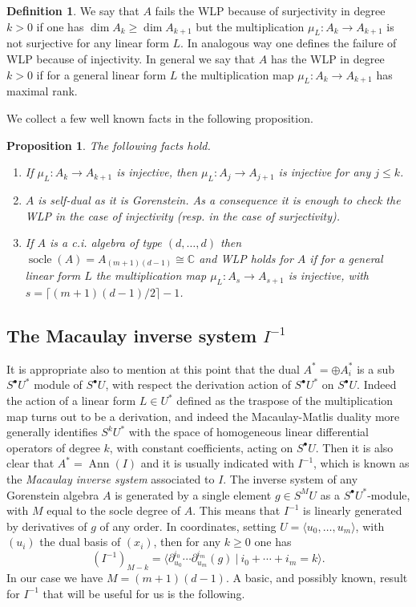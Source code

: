 \documentclass[10pt, a4paper]{amsart}
\theoremstyle{plain}
\newtheorem{prop}{Proposition}
\theoremstyle{definition}
\newtheorem{definition}{Definition}
\theoremstyle{remark}
\def\C{\mathbb{C}}
\begin{document}
  \begin{definition} We say that $A$ fails the WLP because of surjectivity in degree $k>0$  if one has $\dim A_{k}\geq \dim A_{k+1}$ but the multiplication $\mu_L\colon A_{k}\to A_{k+1}$ is not surjective for any linear form $L$. In analogous way one defines the failure of WLP because of injectivity. In general we say that $A$ has the WLP in degree $k>0$ if for a general linear form $L$ the multiplication map $\mu_L\colon A_{k}\to A_{k+1}$ has maximal rank. 
  \end{definition}
  We collect a few well known facts in the following proposition.
 \begin{prop}\label{prop:dualWLP} The following facts hold.
 \begin{enumerate}
 \item If $\mu_L:A_{k}\to A_{k+1}$ is injective, then $\mu_L:A_{j}\to A_{j+1}$ is injective for any $j\leq k$.
 \item $A$ is self-dual as it is Gorenstein. As a consequence it is enough to check the WLP in the case of injectivity (resp. in the case of surjectivity).
 \item If $A$ is a c.i. algebra of type $(d,\ldots,d)$ then $\operatorname{socle}(A)=A_{(m+1)(d-1)}\cong \C$ and WLP holds for $A$ if for a general  linear form $L$ the multiplication map $\mu_L:A_{s}\to A_{s+1}$ is injective, with $s=\lceil (m+1)(d-1)/2\rceil -1$.  
 \end{enumerate}
 \end{prop}
 \subsection{The Macaulay inverse system $I^{-1}$}\label{subsec:inverse}
 It is appropriate also to mention at this point that the dual $A^\ast=\oplus A_i^\ast$ is a sub $S^\bullet U^\ast$ module of $S^\bullet U$, with respect the derivation action of $S^\bullet U^\ast$ on $S^\bullet U$. Indeed the action of a linear form $L\in U^\ast$ defined as the traspose of the multiplication map turns out to be a derivation, and indeed the Macaulay-Matlis duality more generally identifies $S^kU^\ast$ with the space of homogeneous linear differential operators  of degree $k$, with constant coefficients, acting on $S^\bullet U$. Then it is also clear that $A^\ast=\operatorname{Ann}(I)$ and it is usually indicated with $I^{-1}$, which is known as the {\em Macaulay inverse system} associated to $I$. The inverse system of any Gorenstein algebra $A$ is generated by a single element $g\in S^MU$ as a $S^\bullet U^\ast$-module, with $M$ equal to the socle degree of $A$. This means that $I^{-1}$ is linearly generated by derivatives of $g$ of any order.  In coordinates, setting $U=\langle u_0,\ldots, u_m\rangle$, with $(u_i)$ the dual  basis of $(x_i)$, then for any 
 $k\geq 0$ one has
 $$(I^{-1})_{M-k}=\langle \partial_{u_0}^{i_0}\cdots\partial_{u_m}^{i_m}(g)\ |\ i_0+\cdots+i_m=k\rangle.$$
 In our case we have $M=(m+1)(d-1)$. A basic, and possibly known, result for $I^{-1}$ that will be useful for us is the following.
\end{document}
